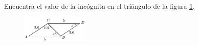 \question[10]  Encuentra el valor de la incógnita en el triángulo de la figura \ref{fig:angle_triangle_19}.
\begin{figure}[H]
    \begin{center}
        \includegraphics[width=0.3\textwidth]{../images/angle_triangle_19.png}
    \end{center}
    \caption{}
    \label{fig:angle_triangle_19}
\end{figure}